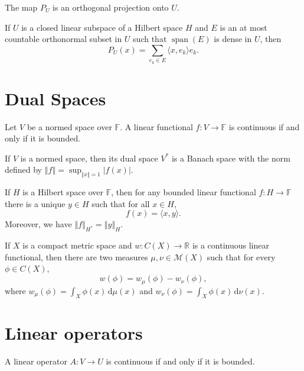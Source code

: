 \documentclass[a4paper]{article}
\newcommand{\F}{\mathbb{F}}
\newcommand{\R}{\mathbb{R}}
\newcommand{\integ}[4]{\int_{#1}^{#2}\!{#3}\,\mathrm{d}{#4}}
\newcommand{\norm}[1]{\left\Vert #1 \right\Vert}
\newcommand{\<}{\langle}
\renewcommand{\>}{\rangle}
\renewcommand{\span}{\operatorname{span}}
\begin{document}
\begin{prop}
  The map $P_U$ is an orthogonal projection onto $U$.
\end{prop}

\begin{prop}
  If $U$ is a closed linear subspace of a Hilbert space $H$ and $E$ is an at most countable orthonormal subset in $U$ such that $\span(E)$ is dense in $U$, then
  $$P_U(x) = \sum_{e_k\in E}\<x,e_k\>e_k.$$
\end{prop}

\section{Dual Spaces}

\begin{prop}
  Let $V$ be a normed space over $\F$. A linear functional $f:V\to\F$ is continuous if and only if it is bounded.
\end{prop}

\begin{prop}
  If $V$ is a normed space, then its dual space $V^*$ is a Banach space with the norm defined by $\norm{f}=\sup_{\norm{x}=1}|f(x)|$.
\end{prop}

\begin{thm}
  If $H$ is a Hilbert space over $\F$, then for any bounded linear functional $f:H\to\F$ there is a unique $y\in H$ such that for all $x\in H$,
  $$f(x) = \<x,y\>.$$
  Moreover, we have $\norm{f}_{H^*} = \norm{y}_H$.
\end{thm}

\begin{thm}
  If $X$ is a compact metric space and $w:C(X)\to\R$ is a continuous linear functional, then there are two measures $\mu,\nu\in\mathcal{M}(X)$ such that for every $\phi\in C(X)$,
  $$w(\phi) = w_\mu(\phi) - w_\nu(\phi),$$
  where $ w_\mu(\phi) = \integ{X}{}{\phi(x)}{\mu(x)}$ and $w_\nu(\phi) = \integ{X}{}{\phi(x)}{\nu(x)}$.
\end{thm}

\section{Linear operators}

\begin{lemma}
  A linear operator $A:V\to U$ is continuous if and only if it is bounded.
\end{lemma}
\end{document}

